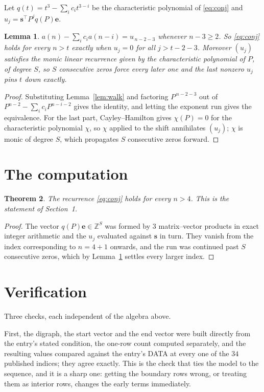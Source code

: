 \documentclass[11pt,a4paper]{article}
\theoremstyle{plain}
\newtheorem{theorem}{Theorem}
\newtheorem{lemma}[theorem]{Lemma}
\theoremstyle{definition}
\begin{document}
Let $q(t)=t^{3}-\sum_i c_i t^{3-i}$ be the characteristic polynomial of
\eqref{eq:conj} and $u_j=\mathbf{s}^{\!\top}P^{j}q(P)\mathbf{e}$.

\begin{lemma}\label{lem:crit}
$a(n)-\sum_i c_i a(n-i)=u_{\,n-2-3}$ whenever $n-3\ge2$. So \eqref{eq:conj}
holds for every $n>t$ exactly when $u_j=0$ for all $j>t-2-3$. Moreover $(u_j)$
satisfies the monic linear recurrence given by the characteristic polynomial of $P$, of
degree $S$, so $S$ consecutive zeros force every later one and the last nonzero $u_j$ pins
$t$ down exactly.
\end{lemma}

\begin{proof}
Substituting Lemma~\ref{lem:walk} and factoring $P^{\,n-2-3}$ out of
$P^{n-2}-\sum_i c_i P^{n-i-2}$ gives the identity, and letting the exponent run gives the
equivalence. For the last part, Cayley--Hamilton gives $\chi(P)=0$ for the characteristic
polynomial $\chi$, so $\chi$ applied to the shift annihilates $(u_j)$; $\chi$ is monic of
degree $S$, which propagates $S$ consecutive zeros forward.
\end{proof}

\section{The computation}

\begin{theorem}
The recurrence \eqref{eq:conj} holds for every $n>4$. This is the statement of
Section~1.
\end{theorem}

\begin{proof}
The vector $q(P)\mathbf{e}\in\mathbb{Z}^{S}$ was formed by $3$ matrix--vector
products in exact integer arithmetic and the $u_j$ evaluated against $\mathbf{s}$ in turn.
They vanish from the index corresponding to $n=4+1$ onwards, and the run was continued
past $S$ consecutive zeros, which by Lemma~\ref{lem:crit} settles every larger index.
\end{proof}

\section{Verification}

Three checks, each independent of the algebra above.

First, the digraph, the start vector and the end vector were built directly from the
entry's stated condition, the one-row count computed separately, and the resulting values
compared against the entry's DATA at every one of the $34$ published indices; they
agree exactly. This is the check that ties the model to the sequence, and it is a sharp one:
getting the boundary rows wrong, or treating them as interior rows, changes the early terms
immediately.
\end{document}
